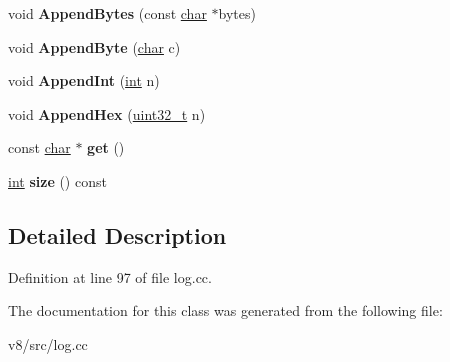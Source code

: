 \begin{DoxyCompactItemize}
void {\bfseries Append\+Bytes} (const \mbox{\hyperlink{classchar}{char}} $\ast$bytes)
\item 
\mbox{\label{classv8_1_1internal_1_1CodeEventLogger_1_1NameBuffer_a15e386f0af065f8e24d9618984d5c81c}} 
void {\bfseries Append\+Byte} (\mbox{\hyperlink{classchar}{char}} c)
\item 
\mbox{\label{classv8_1_1internal_1_1CodeEventLogger_1_1NameBuffer_a27cebc7c49e02021340b948768737f71}} 
void {\bfseries Append\+Int} (\mbox{\hyperlink{classint}{int}} n)
\item 
\mbox{\label{classv8_1_1internal_1_1CodeEventLogger_1_1NameBuffer_a968c4b740fcf4dc461a27e40e5abe6cf}} 
void {\bfseries Append\+Hex} (\mbox{\hyperlink{classuint32__t}{uint32\+\_\+t}} n)
\item 
\mbox{\label{classv8_1_1internal_1_1CodeEventLogger_1_1NameBuffer_adb373c1d68105915a34309ed08a0b451}} 
const \mbox{\hyperlink{classchar}{char}} $\ast$ {\bfseries get} ()
\item 
\mbox{\label{classv8_1_1internal_1_1CodeEventLogger_1_1NameBuffer_a1ba6c38c192c08f59767cddaff12a3e3}} 
\mbox{\hyperlink{classint}{int}} {\bfseries size} () const
\end{DoxyCompactItemize}


\subsection{Detailed Description}


Definition at line 97 of file log.\+cc.



The documentation for this class was generated from the following file\+:\begin{DoxyCompactItemize}
\item 
v8/src/log.\+cc\end{DoxyCompactItemize}
